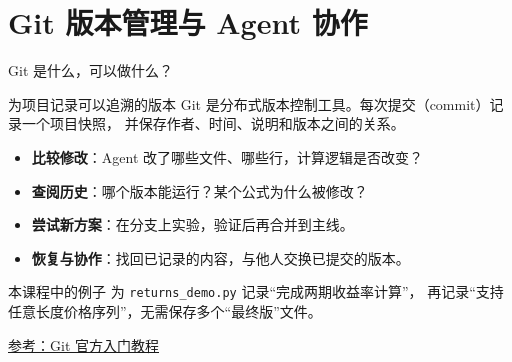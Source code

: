 \documentclass[9pt]{ctexbeamer}
\begin{document}
\section{Git 版本管理与 Agent 协作}

\begin{frame}{Git 是什么，可以做什么？}
  \begin{block}{为项目记录可以追溯的版本}
    Git 是分布式版本控制工具。每次提交（commit）记录一个项目快照，
    并保存作者、时间、说明和版本之间的关系。
  \end{block}
  \begin{itemize}
    \item \textbf{比较修改}：Agent 改了哪些文件、哪些行，计算逻辑是否改变？
    \item \textbf{查阅历史}：哪个版本能运行？某个公式为什么被修改？
    \item \textbf{尝试新方案}：在分支上实验，验证后再合并到主线。
    \item \textbf{恢复与协作}：找回已记录的内容，与他人交换已提交的版本。
  \end{itemize}
  \begin{block}{本课程中的例子}
    为 \texttt{returns\_demo.py} 记录“完成两期收益率计算”，
    再记录“支持任意长度价格序列”，无需保存多个“最终版”文件。
  \end{block}
  {\tiny\href{https://git-scm.com/docs/gittutorial}{参考：Git 官方入门教程}}
\end{frame}
\end{document}
